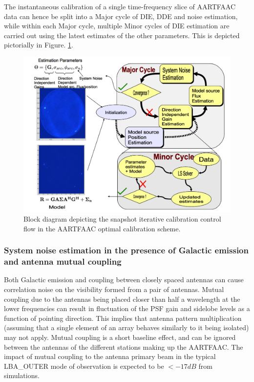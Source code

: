 \documentclass{aa}
\begin{document}
The instantaneous calibration of a single time-frequency slice of
AARTFAAC data can hence be split into a Major cycle of DIE, DDE and
noise estimation, while within each Major cycle, multiple Minor cycles
of DIE estimation are carried out using the latest estimates of the
other parameters. This is depicted pictorially in Figure. \ref{fig:Block-diagram-depicting}.

\begin{figure}[tbh]
\includegraphics[width=1\columnwidth]{Figs/convergent_cal_blkdia}\caption{\label{fig:Block-diagram-depicting}Block diagram depicting the snapshot
iterative calibration control flow in the AARTFAAC optimal calibration
scheme. }
\end{figure}



\subsubsection{\label{sub:System-noise-estimation}System noise estimation in the
presence of Galactic emission and antenna mutual coupling}

Both Galactic emission and coupling between closely spaced antennas
can cause correlation noise on the visibility formed from a pair of
antennas. Mutual coupling due to the antennas being placed closer
than half a wavelength at the lower frequencies can result in fluctuation
of the PSF gain and sidelobe levels as a function of pointing direction\citep{agrawal1972mutual}.
This implies that antenna pattern multiplication (assuming that a
single element of an array behaves similarly to it being isolated)
may not apply. Mutual coupling is a short baseline effect, and can
be ignored between the antennas of the different stations making up
the AARTFAAC. The impact of mutual coupling to the antenna primary
beam in the typical LBA\_OUTER mode of observation is expected to
be $<-17dB$ from simulations\citep{wijnholds2011situ}.
\end{document}
